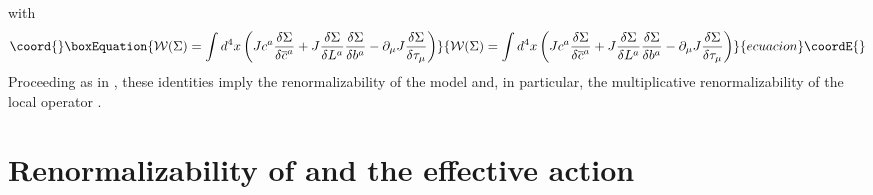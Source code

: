 \documentclass[a4paper,12pt]{article}
\providecommand{\sect}[1]{ \section{#1} \setcounter{equation}{0} }
\begin{document}
with
\begin{equation}\coord{}\boxEquation{
\mathcal{W}(\Sigma )=\int d^{4}x\left( Jc^{a}\frac{\delta \Sigma }{\delta
\overline{c}^{a}}+J\frac{\delta \Sigma }{\delta L^{a}}\frac{\delta \Sigma }{
\delta b^{a}}-\partial _{\mu }J\frac{\delta \Sigma }{\delta \tau _{\mu }}
\right)  \label{dio}
}{
\mathcal{W}(\Sigma )=\int d^{4}x\left( Jc^{a}\frac{\delta \Sigma }{\delta
\overline{c}^{a}}+J\frac{\delta \Sigma }{\delta L^{a}}\frac{\delta \Sigma }{
\delta b^{a}}-\partial _{\mu }J\frac{\delta \Sigma }{\delta \tau _{\mu }}
\right)  }{ecuacion}\coordE{}\end{equation}
Proceeding as in \cite{Dudal:2002pq}, these identities imply the
renormalizability of the model and, in particular, the multiplicative
renormalizability of the local operator \coordHE{}.

\sect{Renormalizability of \myHighlight{$\mathcal{O}$}\coordHE{} and the effective action}

\label{sec3}
\end{document}
